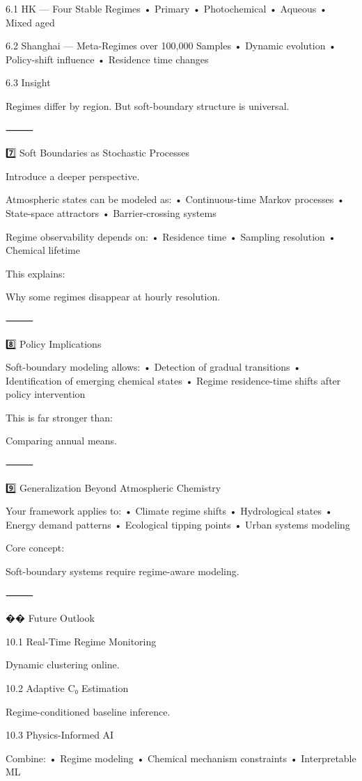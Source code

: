 6.1 HK — Four Stable Regimes
	•	Primary
	•	Photochemical
	•	Aqueous
	•	Mixed aged

6.2 Shanghai — Meta-Regimes over 100,000 Samples
	•	Dynamic evolution
	•	Policy-shift influence
	•	Residence time changes

6.3 Insight

Regimes differ by region.
But soft-boundary structure is universal.

⸻

7️⃣ Soft Boundaries as Stochastic Processes

Introduce a deeper perspective.

Atmospheric states can be modeled as:
	•	Continuous-time Markov processes
	•	State-space attractors
	•	Barrier-crossing systems

Regime observability depends on:
	•	Residence time
	•	Sampling resolution
	•	Chemical lifetime

This explains:

Why some regimes disappear at hourly resolution.

⸻

8️⃣ Policy Implications

Soft-boundary modeling allows:
	•	Detection of gradual transitions
	•	Identification of emerging chemical states
	•	Regime residence-time shifts after policy intervention

This is far stronger than:

Comparing annual means.

⸻

9️⃣ Generalization Beyond Atmospheric Chemistry

Your framework applies to:
	•	Climate regime shifts
	•	Hydrological states
	•	Energy demand patterns
	•	Ecological tipping points
	•	Urban systems modeling

Core concept:

Soft-boundary systems require regime-aware modeling.

⸻

�� Future Outlook

10.1 Real-Time Regime Monitoring

Dynamic clustering online.

10.2 Adaptive C₀ Estimation

Regime-conditioned baseline inference.

10.3 Physics-Informed AI

Combine:
	•	Regime modeling
	•	Chemical mechanism constraints
	•	Interpretable ML

